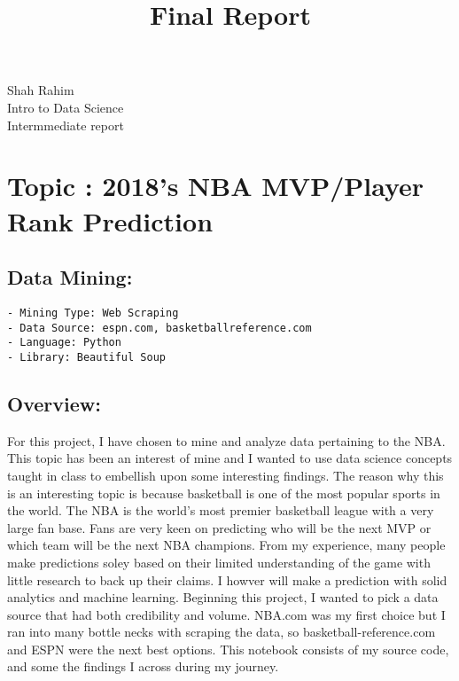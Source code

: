 \documentclass[11pt]{article}
\title{Final Report}
\begin{document}
    
    
    \maketitle
    
    

    
    Shah Rahim\\
Intro to Data Science\\
Intermmediate report

\section{Topic : 2018's NBA MVP/Player Rank
Prediction}\label{topic-2018s-nba-mvpplayer-rank-prediction}

\subsection{Data Mining:}\label{data-mining}

\begin{verbatim}
- Mining Type: Web Scraping
- Data Source: espn.com, basketballreference.com
- Language: Python
- Library: Beautiful Soup
\end{verbatim}

\subsection{Overview:}\label{overview}

For this project, I have chosen to mine and analyze data pertaining to
the NBA. This topic has been an interest of mine and I wanted to use
data science concepts taught in class to embellish upon some interesting
findings. The reason why this is an interesting topic is because
basketball is one of the most popular sports in the world. The NBA is
the world's most premier basketball league with a very large fan base.
Fans are very keen on predicting who will be the next MVP or which team
will be the next NBA champions. From my experience, many people make
predictions soley based on their limited understanding of the game with
little research to back up their claims. I howver will make a prediction
with solid analytics and machine learning. Beginning this project, I
wanted to pick a data source that had both credibility and volume.
NBA.com was my first choice but I ran into many bottle necks with
scraping the data, so basketball-reference.com and ESPN were the next
best options. This notebook consists of my source code, and some the
findings I across during my journey.
\end{document}

